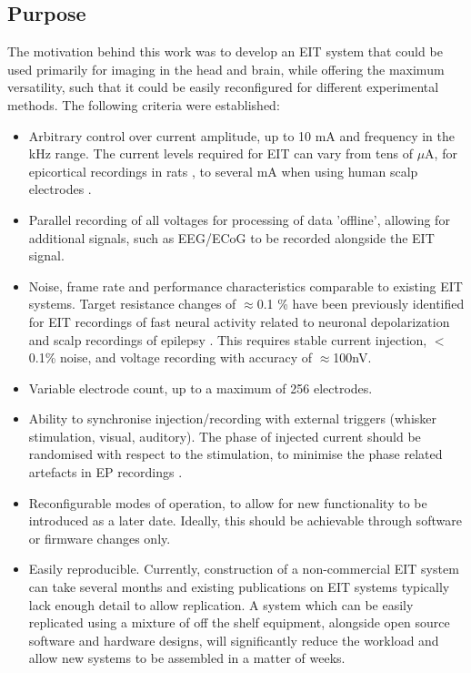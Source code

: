 \subsection{Purpose}

The motivation behind this work was to develop an EIT system that could be used primarily for imaging in the head and brain, while offering the maximum versatility, such that it could be easily reconfigured for different experimental methods. The following criteria were established:


\begin{itemize}
\item Arbitrary control over current amplitude, up to 10 mA and frequency in the kHz range. The current levels required for EIT can vary from tens of $\mu$A, for epicortical recordings in rats \cite{Oh2011}, to several mA when using human scalp electrodes \cite{tidswell2001three}.
\item Parallel recording of all voltages for processing of data 'offline', allowing for additional signals, such as EEG/ECoG to be recorded alongside the EIT signal.
\item Noise, frame rate and performance characteristics comparable to existing EIT systems. Target resistance changes of $\approx$0.1 \% have been previously identified for EIT recordings of fast neural activity related to neuronal depolarization and scalp recordings of epilepsy \cite{Oh2011,Fabrizi_2006}. This requires stable current injection, $<$0.1\% noise, and voltage recording with accuracy of $\approx$100nV.
\item Variable electrode count, up to a maximum of 256 electrodes.
\item Ability to synchronise injection/recording with external triggers (whisker stimulation, visual, auditory). The phase of injected current should be randomised with respect to the stimulation, to minimise the phase related artefacts in EP recordings \cite{Aristovich_2015}.
\item Reconfigurable modes of operation, to allow for new functionality to be introduced as a later date. Ideally, this should be achievable  through software or firmware changes only.
\item Easily reproducible. Currently, construction of a non-commercial EIT system can take several months and existing publications on EIT systems typically lack enough detail to allow replication. A system which can be easily replicated using a mixture of off the shelf equipment, alongside open source software and hardware designs, will significantly reduce the workload and allow new systems to be assembled in a matter of weeks.
\end{itemize}

